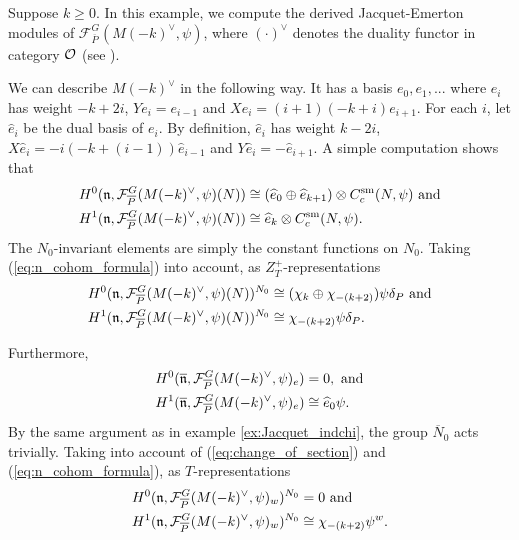 \documentclass[10pt]{amsart}
\begin{document}
\begin{example}
Suppose $k\geq 0$. In this example, we compute the derived Jacquet-Emerton modules of $\mathcal{F}_{\overline{P}}^{G}(M(-k)^{\vee},\psi)$, where $(\cdot)^{\vee}$ denotes the duality functor in category $\mathcal{O}$ (see \cite{Humphreys}). 

We can describe $M(-k)^{\vee}$ in the following way. It has a basis $e_{0},e_{1},...$ where $e_{i}$ has weight $-k+2i$, $Ye_{i}=e_{i-1}$ and $Xe_{i}=(i+1)(-k+i)e_{i+1}$. For each $i$, let $\widehat{e}_{i}$ be the dual basis of $e_{i}$. By definition, $\widehat{e}_{i}$ has weight $k-2i$, $X\widehat{e}_{i}=-i(-k+(i-1))\widehat{e}_{i-1}$ and $Y\widehat{e}_{i}=-\widehat{e}_{i+1}$. A simple computation shows that
\begin{align*}
    H^{0}(\mathfrak{n},\mathcal{F}_{\overline{P}}^{G}(M(-k)^{\vee},\psi)(N)) &\cong (\widehat{e}_{0}\oplus\widehat{e}_{k+1}) \otimes C_{c}^{\text{sm}}(N,\psi) \textnormal{ and} \\
    H^{1}(\mathfrak{n},\mathcal{F}_{\overline{P}}^{G}(M(-k)^{\vee},\psi)(N)) &\cong \widehat{e}_{k} \otimes C_{c}^{\text{sm}}(N,\psi).
\end{align*} The $N_{0}$-invariant elements are simply the constant functions on $N_{0}$. Taking (\ref{eq:n_cohom_formula}) into account, as $Z_{T}^{+}$-representations \begin{align*}
    H^{0}(\mathfrak{n},\mathcal{F}_{\overline{P}}^{G}(M(-k)^{\vee},\psi)(N))^{N_{0}} &\cong (\chi_{k}\oplus\chi_{-(k+2)}) \psi\delta_{P} \textnormal{ and} \\
    H^{1}(\mathfrak{n},\mathcal{F}_{\overline{P}}^{G}(M(-k)^{\vee},\psi)(N))^{N_{0}} &\cong \chi_{-(k+2)} \psi\delta_{P}.
\end{align*}

Furthermore, \begin{align*}
    H^{0}(\overline{\mathfrak{n}},\mathcal{F}_{\overline{P}}^{G}(M(-k)^{\vee},\psi)_{e}) &= 0, \textnormal{ and} \\
    H^{1}(\overline{\mathfrak{n}},\mathcal{F}_{\overline{P}}^{G}(M(-k)^{\vee},\psi)_{e}) &\cong \widehat{e}_{0} \psi.
\end{align*} By the same argument as in example \ref{ex:Jacquet_indchi}, the group $\overline{N}_{0}$ acts trivially. Taking into account of (\ref{eq:change_of_section}) and (\ref{eq:n_cohom_formula}), as $T$-representations \begin{align*}
    H^{0}(\mathfrak{n},\mathcal{F}_{\overline{P}}^{G}(M(-k)^{\vee},\psi)_{w})^{N_{0}} &= 0 \textnormal{ and} \\
    H^{1}(\mathfrak{n},\mathcal{F}_{\overline{P}}^{G}(M(-k)^{\vee},\psi)_{w})^{N_{0}} &\cong \chi_{-(k+2)}\psi^{w}.
\end{align*}


\end{example}
\end{document}
